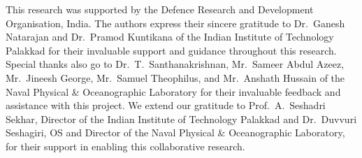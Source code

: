 \documentclass[twocolumn,10pt]{asme2ej}
\begin{document}
\begin{acknowledgment}
This research was supported by the Defence Research and Development Organisation, India. The authors express their sincere gratitude to Dr.~Ganesh Natarajan and Dr.~Pramod Kuntikana of the Indian Institute of Technology Palakkad for their invaluable support and guidance throughout this research. Special thanks also go to Dr.~T.~Santhanakrishnan, Mr.~Sameer Abdul Azeez, Mr.~Jineesh George, Mr.~Samuel Theophilus, and Mr.~Anshath Hussain of the Naval Physical \& Oceanographic Laboratory for their invaluable feedback and assistance with this project. We extend our gratitude to Prof.~A.~Seshadri Sekhar, Director of the Indian Institute of Technology Palakkad and Dr.~Duvvuri Seshagiri, OS and Director of the Naval Physical \& Oceanographic Laboratory, for their support in enabling this collaborative research.
\end{acknowledgment}

%




\end{document}
